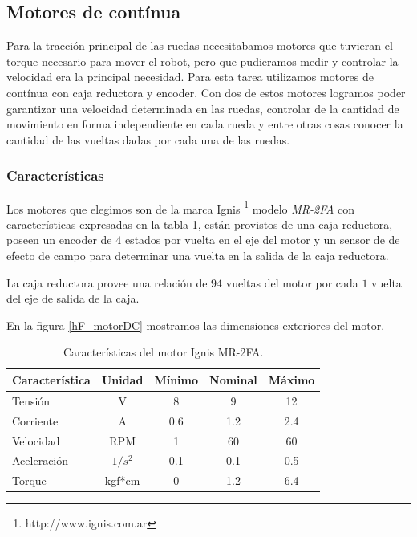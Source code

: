 \subsection{Motores de cont\'inua}
\label{h_actuadores_motorDC}

Para la tracci\'on principal de las ruedas necesitabamos motores que tuvieran el torque necesario para mover el robot, pero que pudieramos medir y
controlar la velocidad era la principal necesidad. Para esta tarea utilizamos motores de cont\'inua con caja reductora y encoder.
Con dos de estos motores logramos poder garantizar una velocidad determinada en las ruedas, controlar de la cantidad de movimiento en forma
independiente en cada rueda y entre otras cosas conocer la cantidad de las vueltas dadas por cada una de las ruedas.

\subsubsection{Caracter\'isticas}
\label{h_actuadores_motorDC_caracteristicas}

Los motores que elegimos son de la marca Ignis \footnote{http://www.ignis.com.ar} modelo \emph{MR-2FA} con caracter\'isticas expresadas en la tabla
\ref{hT_motorDC}, est\'an provistos de una caja reductora, poseen un encoder de $4$ estados por vuelta en el eje del motor y un sensor de de efecto
de campo para determinar una vuelta en la salida de la caja reductora.

La caja reductora provee una relaci\'on de $94$ vueltas del motor por cada $1$ vuelta del eje de salida de la caja.

En la figura \ref{hF_motorDC} mostramos las dimensiones exteriores del motor.

\begin{table}
	\begin{center}
		\begin{tabular}{|l|c|c|c|c|}
			\hline
			Caracter\'istica & Unidad & M\'inimo & Nominal & M\'aximo \\
			\hline
			Tensi\'on & V & 8 & 9 & 12 \\
			Corriente & A & 0.6 & 1.2 & 2.4 \\
			Velocidad & RPM & 1 & 60 & 60 \\
			Aceleraci\'on & $1/s^{2}$ & 0.1 & 0.1 & 0.5 \\
			Torque & kgf*cm & 0 & 1.2 & 6.4 \\
			\hline
		\end{tabular}
	\end{center}
	\caption{Caracter\'isticas del motor Ignis MR-2FA.}
	\label{hT_motorDC}
\end{table}

